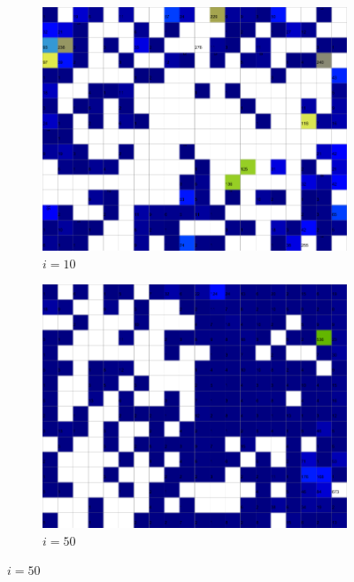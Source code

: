 \documentclass{acm_proc_article-sp}
\begin{document}
\begin{figure}
\centering
    \centering
    \begin{subfigure}[b]{0.24\linewidth}
        \includegraphics[width=\linewidth]{img/wine-newmid-quantization-error-i-10}
        \caption{$i=10$}
        \label{fig:wine-newmid-quantization-error-i-10}
    \end{subfigure}
    \begin{subfigure}[b]{0.24\linewidth}
        \includegraphics[width=\linewidth]{img/wine-newmid-quantization-error-i-50}
        \caption{$i=50$}
        \label{fig:wine-newmid-quantization-error-i-50}

\end{subfigure}
\end{figure}
\end{document}
